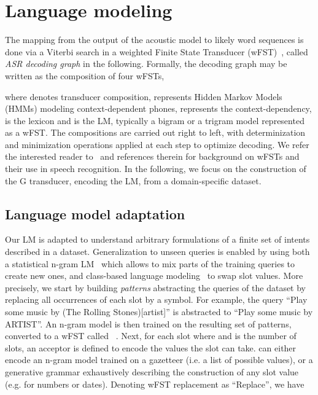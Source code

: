 \documentclass{article}
\begin{document}
  
\section{Language modeling}
\label{sec:language_model}
  
  The mapping from the output of the acoustic model to likely word sequences is done via a Viterbi search in a weighted Finite State Transducer (wFST)~\cite{mohri2001weighted}, called \emph{ASR decoding graph} in the following. 
  Formally, the decoding graph may be written as the composition of four wFSTs,
  
  where  denotes transducer composition,  represents Hidden Markov Models (HMMs) modeling context-dependent phones,  represents the context-dependency,  is the lexicon and  is the LM, typically a bigram or a trigram model represented as a wFST. 
  The compositions are carried out right to left, with determinization and minimization operations \cite{mohri2001weighted} applied at each step to optimize decoding. 
  We refer the interested reader to~\cite{mohri2001weighted,povey2011kaldi} and references therein for background on wFSTs and their use in speech recognition.
  In the following, we focus on the construction of the G transducer, encoding the LM, from a domain-specific dataset.


\subsection{Language model adaptation}
\label{subsec:adapated_lm}

  Our LM is adapted to understand arbitrary formulations of a finite set of intents described in a dataset. 
  Generalization to unseen queries is enabled by using both a statistical n-gram LM~\cite{katz1987estimation} which allows to mix parts of the training queries to create new ones, and class-based language modeling~\cite{brown1992class} to swap slot values. 
  More precisely, we start by building \emph{patterns} abstracting the queries of the dataset by replacing all occurrences of each slot by a symbol. 
  For example, the query ``Play some music by (The Rolling Stones)[artist]'' is abstracted to ``Play some music by ARTIST''. 
  An n-gram model is then trained on the resulting set of patterns, converted to a wFST called ~\cite{mohri2001weighted}. 
  Next, for each slot  where  and  is the number of slots, an acceptor  is defined to encode the values the slot can take. 
   can either encode an n-gram model trained on a gazetteer (i.e. a list of possible values), or a generative grammar exhaustively describing the construction of any slot value (e.g. for numbers or dates). 
  Denoting wFST replacement as ``Replace'', we have~\cite{horndasch2016add}
  
\end{document}
